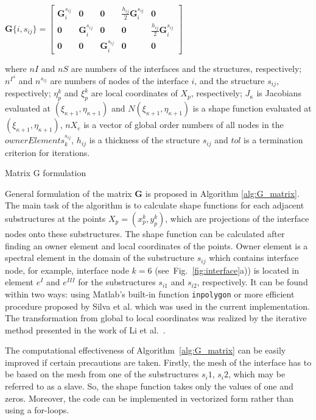 \documentclass[materials,article,submit,moreauthors,pdftex]{Definitions/mdpi}
\begin{document}
{\begin{algorithm}[H]
{{{				\(\mathbf{G}\{i,s_{ij}\}=\left[\begin{array}{ccccc}
				\mathbf{G}^{s_{ij}}_i & \mathbf{0} & \mathbf{0} & 
				\frac{h_{ij}}{2}\mathbf{G}^{s_{ij}}_i & \mathbf{0}\\
				\mathbf{0} & \mathbf{G}^{s_{ij}}_i & \mathbf{0} & \mathbf{0} & 
				\frac{h_{ij}}{2}\mathbf{G}^{s_{ij}}_i\\
				\mathbf{0} & \mathbf{0} & \mathbf{G}^{s_{ij}}_i & \mathbf{0} & 
				\mathbf{0}
				\end{array} \right]
				\)\;	}
			
		}
	}
	where \(nI\) and \(nS\) are numbers of the interfaces and the structures, respectively; \(n^{\Gamma^i}\) and \(n^{s_{ij}}\) are numbers of nodes of the interface \(i\), and the structure \(s_{ij}\), respectively; \(\eta^k_p\) and  \(\xi^k_p\) are local coordinates of \(X_p\), respectively; \(J_{\kappa}\) is Jacobians evaluated at \((\xi_{\kappa+1},\eta_{\kappa+1})\) and \(N(\xi_{\kappa+1},\eta_{\kappa+1})\) is a shape function evaluated at \((\xi_{\kappa+1},\eta_{\kappa+1})\), \(nX_e\) is a vector of global order numbers of all nodes in the \(ownerElements^{s_{ij}}_k\), \(h_{ij}\) is a thickness of the structure \(s_{ij}\) and \(tol\) is a termination criterion for iterations.
	\caption{Matrix G formulation}
	\label{alg:G_matrix}
\end{algorithm}
General formulation of the matrix \textbf{G} is proposed in Algorithm \ref{alg:G_matrix}.
The main task of the algorithm is to calculate shape functions for each adjacent substructures at the points \(X_p=(x_p^k,y_p^k)\), which are projections of the interface nodes onto these substructures.
The shape function can be calculated after finding an owner element and local coordinates of the points.
Owner element is a spectral element in the domain of the substructure \(s_{ij}\) which contains interface node, for example, interface node \(k=6\) (see~Fig.~\ref{fig:interface}a)) is located in element \(e^I\) and \(e^{III}\) for the substructures \(s_{i1}\) and \(s_{i2}\), respectively.
It can be found within two ways: using Matlab's built-in function \verb+inpolygon+ or more efficient procedure proposed by Silva et al. \cite{silva2009exact} which was used in the current implementation.
The transformation from global to local coordinates was realized by the iterative method presented in the work of Li et al.~\cite{li2014efficient}.

The computational effectiveness of Algorithm~\ref{alg:G_matrix} can be easily improved if certain precautions are taken.
Firstly, the mesh of the interface has to be based on the mesh from one of the substructures \(s_i1\), \(s_i2\), which may be referred to as a slave.
So, the shape function takes only the values of one and zeros.
Moreover, the code can be implemented in vectorized form rather than using a for-loops.

}
\end{document}
